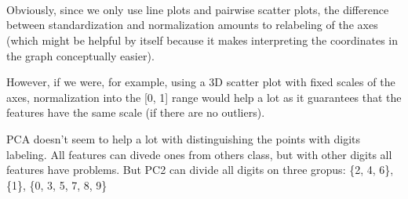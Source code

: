     \begin{center}
    \end{center}
    { \hspace*{\fill} \\}
    
    \begin{center}
    \end{center}
    { \hspace*{\fill} \\}
    
    \begin{center}
    \end{center}
    { \hspace*{\fill} \\}
    
    Obviously, since we only use line plots and pairwise scatter plots, the difference between standardization and normalization amounts to relabeling of the axes (which might be helpful by itself because it makes interpreting the coordinates in the graph conceptually easier).
    
    However, if we were, for example, using a 3D scatter plot with fixed scales of the axes, normalization into the [0, 1] range would help a lot as it guarantees that the features have the same scale (if there are no outliers).
    
    PCA doesn’t seem to help a lot with distinguishing the points with digits labeling. All features can divede ones from others class, but with other digits all features have problems. But PC2 can divide all digits on three gropus: \{2, 4, 6\}, \{1\}, \{0, 3, 5, 7, 8, 9\}
